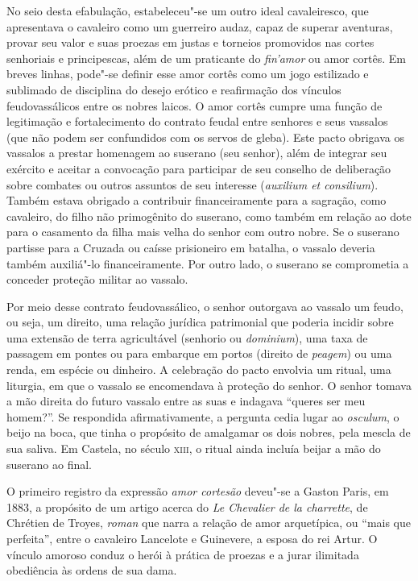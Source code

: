 No seio desta efabulação, estabeleceu"-se um outro ideal cavaleiresco, que
apresentava o cavaleiro como um guerreiro audaz, capaz de superar aventuras,
provar seu valor e suas proezas em justas e torneios promovidos nas cortes
senhoriais e principescas, além de um praticante do \textit{fin’amor} ou amor
cortês. Em breves linhas, pode"-se definir esse amor cortês como um jogo
estilizado e sublimado de disciplina do desejo erótico e reafirmação dos
vínculos feudovassálicos entre os nobres laicos.  O amor cortês cumpre uma
função de legitimação e fortalecimento do contrato feudal entre senhores e seus
vassalos (que não podem ser confundidos com os servos de gleba).  Este pacto
obrigava os vassalos a prestar homenagem ao suserano (seu senhor), além de
integrar seu exército e aceitar a convocação para participar de seu conselho de
deliberação sobre combates ou outros assuntos de seu interesse (\textit{auxilium
et consilium}). Também estava obrigado a contribuir financeiramente para a
sagração, como cavaleiro, do filho não primogênito do suserano, como também em
relação ao dote para o casamento da filha mais velha do senhor com outro nobre.
Se o suserano partisse para a Cruzada ou caísse prisioneiro em batalha, o
vassalo deveria também auxiliá"-lo financeiramente. Por outro lado, o suserano se
comprometia a conceder proteção militar ao vassalo.

Por meio desse contrato feudovassálico, o senhor outorgava ao vassalo um feudo,
ou seja, um direito, uma relação jurídica patrimonial que poderia incidir sobre
uma extensão de terra agricultável (senhorio ou \textit{dominium}), uma taxa de
passagem em pontes ou para embarque em portos (direito de \textit{peagem}) ou
uma renda, em espécie ou dinheiro.  A celebração do pacto envolvia um ritual,
uma liturgia, em que o vassalo se encomendava à proteção do senhor. O senhor
tomava a mão direita do futuro vassalo entre as suas e indagava ``queres ser meu
homem?''. Se respondida afirmativamente, a pergunta cedia lugar ao
\textit{osculum}, o beijo na boca, que tinha o propósito de amalgamar os dois
nobres, pela mescla de sua saliva. Em Castela, no século \textsc{xiii}, o ritual
ainda incluía beijar a mão do suserano ao final.

O primeiro
registro da expressão \textit{amor cortesão} deveu"-se a Gaston Paris, em 1883,
a propósito de um artigo acerca do \textit{Le Chevalier de la charrette}, de
Chrétien de Troyes, \textit{roman} que narra a relação de amor arquetípica, ou
“mais que perfeita”, entre o cavaleiro Lancelote e Guinevere, a esposa do rei
Artur. O vínculo amoroso conduz o herói à prática de proezas e a jurar
ilimitada obediência às ordens de sua dama.

